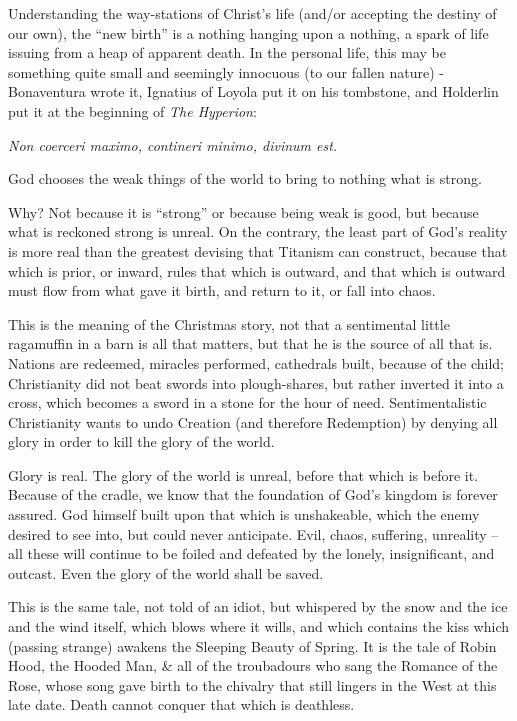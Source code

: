Understanding the way-stations of Christ's life (and/or accepting the destiny of our own), the ``new birth'' is a nothing hanging upon a nothing, a spark of life issuing from a heap of apparent death. In the personal life, this may be something quite small and seemingly innocuous (to our fallen nature) -Bonaventura wrote it, Ignatius of Loyola put it on his tombstone, and Holderlin put it at the beginning of \emph{The Hyperion}:

\begin{quotex}
\emph{Non coerceri maximo, contineri minimo, divinum est.}

God chooses the weak things of the world to bring to nothing what is strong.
\end{quotex}


Why? Not because it is ``strong'' or because being weak is good, but because what is reckoned strong is unreal. On the contrary, the least part of God's reality is more real than the greatest devising that Titanism can construct, because that which is prior, or inward, rules that which is outward, and that which is outward must flow from what gave it birth, and return to it, or fall into chaos.

This is the meaning of the Christmas story, not that a sentimental little ragamuffin in a barn is all that matters, but that he is the source of all that is. Nations are redeemed, miracles performed, cathedrals built, because of the child; Christianity did not beat swords into plough-shares, but rather inverted it into a cross, which becomes a sword in a stone for the hour of need. Sentimentalistic Christianity wants to undo Creation (and therefore Redemption) by denying all glory in order to kill the glory of the world.

Glory is real. The glory of the world is unreal, before that which is before it. Because of the cradle, we know that the foundation of God's kingdom is forever assured. God himself built upon that which is unshakeable, which the enemy desired to see into, but could never anticipate. Evil, chaos, suffering, unreality -- all these will continue to be foiled and defeated by the lonely, insignificant, and outcast. Even the glory of the world shall be saved.

This is the same tale, not told of an idiot, but whispered by the snow and the ice and the wind itself, which blows where it wills, and which contains the kiss which (passing strange) awakens the Sleeping Beauty of Spring. It is the tale of Robin Hood, the Hooded Man, \& all of the troubadours who sang the Romance of the Rose, whose song gave birth to the chivalry that still lingers in the West at this late date. Death cannot conquer that which is deathless.

